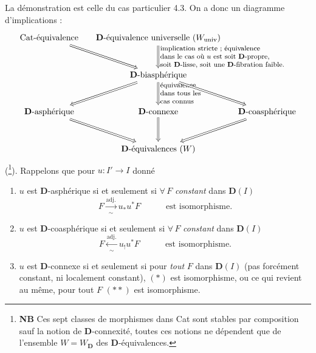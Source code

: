 \documentclass[11pt]{article}
\newcommand{\printedpage}[1]{\marginpar{\footnotesize p.~#1}}
\newcommand{\D}{\mathbf{D}}
\begin{document}
La démonstration est celle du cas particulier 4.3. On a donc un diagramme d'implications :
\[
\begin{tikzcd}[column sep=small, row sep=large]
\text{Cat-équivalence} \ar[dr, Rightarrow] & \D\text{-équivalence universelle } (W_{\mathrm{univ}}) \ar[d, Rightarrow, "{\text{\footnotesize\begin{tabular}{@{}l@{}}implication stricte ; équivalence\\ dans le cas où $u$ est soit $\mathbf{D}$-propre,\\ soit $\mathbf{D}$-lisse, soit une $\mathbf{D}$-fibration faible.\end{tabular}}}"] & \\
 & \D\text{-biasphérique} \ar[dl, Rightarrow] \ar[d, Rightarrow, "{\text{\footnotesize\begin{tabular}{@{}l@{}}équivalence\\ dans tous les\\ cas connus\end{tabular}}}"] \ar[dr, Rightarrow] & \\
\D\text{-asphérique} \ar[dr, Rightarrow] & \D\text{-connexe} \ar[d, Rightarrow] & \D\text{-coasphérique} \ar[dl, Rightarrow] \\
 & \D\text{-équivalences } (W) &
\end{tikzcd}
\]
(\footnote{\textbf{NB} Ces sept classes de morphismes dans Cat sont stables par composition sauf la notion de $\D$-connexité, toutes ces notions ne dépendent que de l'ensemble $W = W_{\D}$ des $\D$-équivalences.}). Rappelons que pour $u : I' \longrightarrow I$ donné
\begin{enumerate}[leftmargin=*, labelindent=1.5em]
\item[a)] $u$ est $\D$-asphérique si et seulement si $\forall\, F$ \textit{constant} dans $\D(I)$
\[
F \xrightarrow[\sim]{\text{adj.}} u_*u^*F \qquad\quad \text{est isomorphisme.} \tag*{$(\ast)$}
\]
\printedpage{41}
\item[b)] $u$ est $\D$-coasphérique si et seulement si $\forall\, F$ \textit{constant} dans $\D(I)$
\[
F \xleftarrow[\sim]{\text{adj.}} u_!u^*F \qquad\quad \text{est isomorphisme.} \tag*{$(\ast\ast)$}
\]
\item[c)] $u$ est $\D$-connexe si et seulement si pour \textit{tout} $F$ dans $\D(I)$ (pas forcément constant, ni localement constant), $(\ast)$ est isomorphisme, ou ce qui revient au même, pour tout $F$ $(\ast\ast)$ est isomorphisme.
\end{enumerate}
\end{document}
